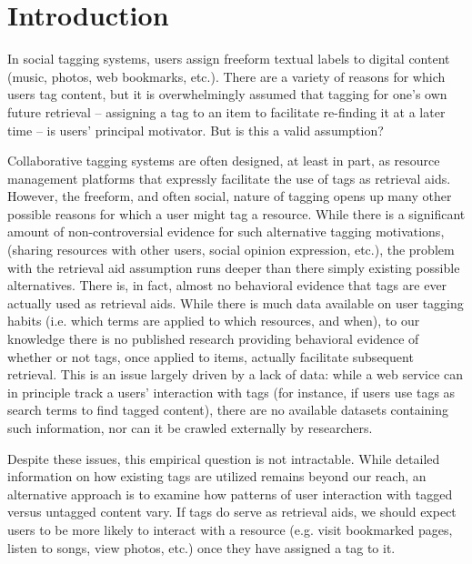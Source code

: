 \section{Introduction}
\label{sec_intro}

In social tagging systems, users assign freeform textual labels to digital content (music, photos, web bookmarks, etc.). There are a variety of reasons for which users tag content, but it is overwhelmingly assumed that tagging for one's own future retrieval -- assigning a tag to an item to facilitate re-finding it at a later time -- is users' principal motivator. But is this a valid assumption?

Collaborative tagging systems are often designed, at least in part, as resource management platforms that expressly facilitate the use of tags as retrieval aids.  However, the freeform, and often social, nature of tagging opens up many other possible reasons for which a user might tag a resource. While there is a significant amount of non-controversial evidence for such alternative tagging motivations, (sharing resources with other users, social opinion expression, etc.), the problem with the retrieval aid assumption runs deeper than there simply existing possible alternatives. There is, in fact, almost no behavioral evidence that tags are ever actually used as retrieval aids. While there is much data available on user tagging habits (i.e. which terms are applied to which resources, and when), to our knowledge there is no published research providing behavioral evidence of whether or not tags, once applied to items, actually facilitate subsequent retrieval. This is an issue largely driven by a lack of data: while a web service can in principle track a users' interaction with tags (for instance, if users use tags as search terms to find tagged content), there are no available datasets containing such information, nor can it be crawled externally by researchers.

Despite these issues, this empirical question is not intractable. While detailed information on how existing tags are utilized remains beyond our reach, an alternative approach is to examine how patterns of user interaction with tagged versus untagged content vary. If tags do serve as retrieval aids, we should expect users to be more likely to interact with a resource (e.g. visit bookmarked pages, listen to songs, view photos, etc.) once they have assigned a tag to it.


